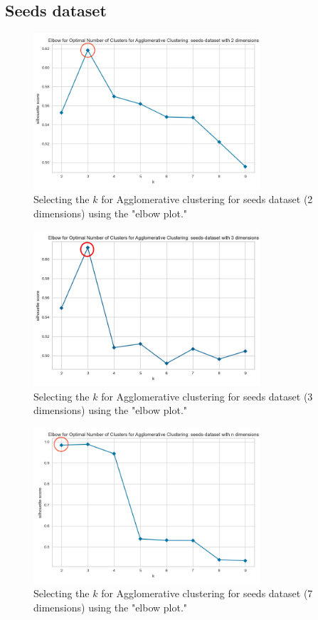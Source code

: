 \subsection{Seeds dataset}
\begin{figure}[H]
  \includegraphics[width=0.75\textwidth]{Appendix//parameter-selection/seeds-dataset-2-agglomerative.png}
  \caption{Selecting the $k$ for Agglomerative clustering for seeds dataset (2 dimensions) using the "elbow plot."}
  \label{hyperparameters:agglomerative-seeds-dataset-2d}
\end{figure}
\begin{figure}[H]
  \includegraphics[width=0.75\textwidth]{Appendix//parameter-selection/seeds-dataset-3-agglomerative.png}
  \caption{Selecting the $k$ for Agglomerative clustering for seeds dataset (3 dimensions) using the "elbow plot."}
  \label{hyperparameters:agglomerative-seeds-dataset-3d}
\end{figure}
\begin{figure}[H]
  \includegraphics[width=0.75\textwidth]{Appendix//parameter-selection/seeds-dataset-n-agglomerative.png}
  \caption{Selecting the $k$ for Agglomerative clustering for seeds dataset (7 dimensions) using the "elbow plot."}
  \label{hyperparameters:agglomerative-seeds-dataset-7d}
\end{figure}
